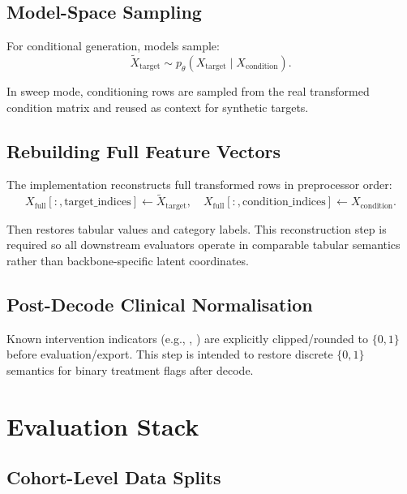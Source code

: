 \subsection{Model-Space Sampling}

For conditional generation, models sample:
\begin{equation}
\tilde{X}_{\text{target}} \sim p_{\theta}(X_{\text{target}} \mid X_{\text{condition}}).
\end{equation}

In sweep mode, conditioning rows are sampled from the real transformed condition matrix and reused as context for synthetic targets.

\subsection{Rebuilding Full Feature Vectors}

The implementation reconstructs full transformed rows in preprocessor order:
\begin{equation}
X_{\text{full}}[:,\text{target\_indices}] \leftarrow \tilde{X}_{\text{target}}, \quad
X_{\text{full}}[:,\text{condition\_indices}] \leftarrow X_{\text{condition}}.
\end{equation}

Then  restores tabular values and category labels.
This reconstruction step is required so all downstream evaluators operate in comparable tabular semantics rather than backbone-specific latent coordinates.

\subsection{Post-Decode Clinical Normalisation}

Known intervention indicators (e.g., , ) are explicitly clipped/rounded to $\{0,1\}$ before evaluation/export.
This step is intended to restore discrete $\{0,1\}$ semantics for binary treatment flags after decode.

\section{Evaluation Stack}

\subsection{Cohort-Level Data Splits}
\label{sec:cohort-splits}

